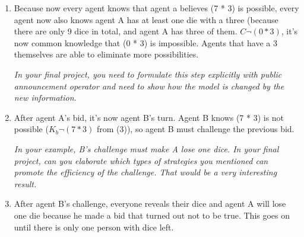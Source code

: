 \documentclass{article}
\begin{document}
\begin{enumerate}
    \item Because now every agent knows that agent a believes (7 * 3) is possible, every agent now also knows agent A has at least one die with a three (because there are only 9 dice in total, and agent A has three of them. $C \neg (0 * 3)$, it's now common knowledge that (0 * 3) is impossible. Agents that have a 3 themselves are able to eliminate more possibilities.
    
    \textit{In your final project, you need to formulate this step explicitly with public announcement operator and need to show how the model is changed by the new information.}
    
    \item After agent A's bid, it's now agent B's turn. Agent B knows (7 * 3) is not possible ($K_b \neg (7 * 3)$ from (3)), so agent B must challenge the previous bid.
    
    \textit{In your example, B’s challenge must make A lose one dice. In your final project, can you elaborate which types of strategies you mentioned can promote the efficiency of the challenge. That would be a very interesting result.}
    
    \item After agent B's challenge, everyone reveals their dice and agent A will lose one die because he made a bid that turned out not to be true. This goes on until there is only one person with dice left.

    
\end{enumerate}
\end{document}
